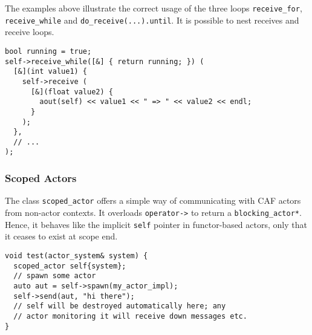 The examples above illustrate the correct usage of the three loops
\lstinline^receive_for^, \lstinline^receive_while^ and
\lstinline^do_receive(...).until^. It is possible to nest receives and receive
loops.

\begin{lstlisting}
bool running = true;
self->receive_while([&] { return running; }) (
  [&](int value1) {
    self->receive (
      [&](float value2) {
        aout(self) << value1 << " => " << value2 << endl;
      }
    );
  },
  // ...
);
\end{lstlisting}

\subsubsection{Scoped Actors}
\label{scoped-actors}

The class \lstinline^scoped_actor^ offers a simple way of communicating with
CAF actors from non-actor contexts. It overloads \lstinline^operator->^ to
return a \lstinline^blocking_actor*^. Hence, it behaves like the implicit
\lstinline^self^ pointer in functor-based actors, only that it ceases to exist
at scope end.

\begin{lstlisting}
void test(actor_system& system) {
  scoped_actor self{system};
  // spawn some actor
  auto aut = self->spawn(my_actor_impl);
  self->send(aut, "hi there");
  // self will be destroyed automatically here; any
  // actor monitoring it will receive down messages etc.
}
\end{lstlisting}
